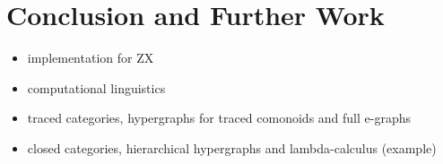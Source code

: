 

\section{Conclusion and Further Work}

\begin{itemize}
\item implementation for ZX
\item computational linguistics
\item traced categories, hypergraphs for traced comonoids and full e-graphs
\item closed categories, hierarchical hypergraphs and lambda-calculus (example)
\end{itemize}